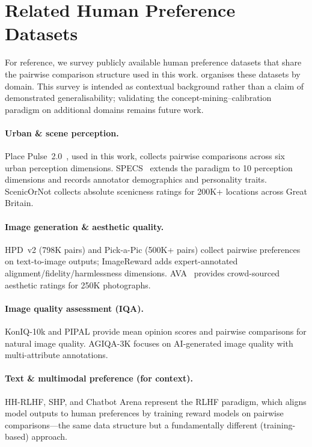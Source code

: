 \documentclass[runningheads]{llncs}
\begin{document}
\FloatBarrier
\section{Related Human Preference Datasets}
\label{sec:preference_datasets}

For reference, we survey publicly available human preference datasets that share the pairwise comparison structure used in this work.
 organises these datasets by domain.
This survey is intended as contextual background rather than a claim of demonstrated generalisability; validating the concept-mining--calibration paradigm on additional domains remains future work.

\paragraph{Urban \& scene perception.}
Place Pulse~2.0~\cite{salesses2013collaborative}, used in this work, collects pairwise comparisons across six urban perception dimensions.
SPECS~\cite{quintana2025specs} extends the paradigm to 10 perception dimensions and records annotator demographics and personality traits.
ScenicOrNot collects absolute scenicness ratings for 200K+ locations across Great Britain.

\paragraph{Image generation \& aesthetic quality.}
HPD~v2 (798K pairs) and Pick-a-Pic (500K+ pairs) collect pairwise preferences on text-to-image outputs; ImageReward adds expert-annotated alignment/fidelity/harmlessness dimensions.
AVA~\cite{murray2012ava} provides crowd-sourced aesthetic ratings for 250K photographs.

\paragraph{Image quality assessment (IQA).}
KonIQ-10k and PIPAL provide mean opinion scores and pairwise comparisons for natural image quality.
AGIQA-3K focuses on AI-generated image quality with multi-attribute annotations.

\paragraph{Text \& multimodal preference (for context).}
HH-RLHF, SHP, and Chatbot Arena represent the RLHF paradigm, which aligns model outputs to human preferences by training reward models on pairwise comparisons---the same data structure but a fundamentally different (training-based) approach.
\end{document}
